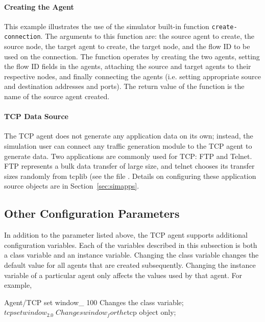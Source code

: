 \paragraph{Creating the Agent}
This example illustrates the use of the simulator built-in
function {\tt create-connection}.
The arguments to this function are: the source agent to create,
the source node, the target agent to create, the target node, and
the flow ID to be used on the connection.
The function operates by creating the two agents, setting the
flow ID fields in the agents, attaching the source and target agents
to their respective nodes, and finally connecting the agents
(i.e. setting appropriate source and destination addresses and ports).
The return value of the function is the name of the source agent created.

\paragraph{TCP Data Source}
The TCP agent does not generate any application data on its own;
instead, the simulation user can connect any traffic generation
module to the TCP agent to generate data.
Two applications are commonly used for TCP: FTP and Telnet.
FTP represents a bulk data transfer of large size, and telnet chooses
its transfer sizes randomly from tcplib (see the file
.
Details on configuring these application source objects are in
Section~\ref{sec:simapps}.

\subsection{Other Configuration Parameters}
\label{sec:other-tcp-config}

In addition to the  parameter listed above,
the TCP agent supports additional configuration variables.
Each of the variables described in this subsection is
both a class variable and an instance variable.
Changing the class variable changes the default value
for all agents that are created subsequently.
Changing the instance variable of a particular agent
only affects the values used by that agent.
For example,
\begin{program}
  Agent/TCP set window_ 100     \; Changes the class variable;
  $tcp set window_ 2.0          \; Changes window_ for the $tcp object only;
\end{program}


